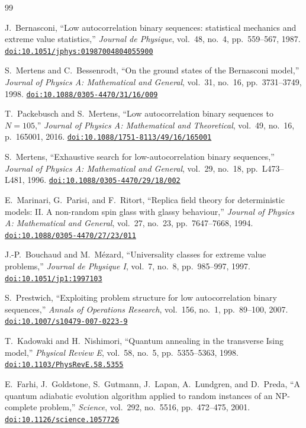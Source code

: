 \documentclass[12pt,a4paper]{report}
\providecommand{\doi}[1]{\href{https://doi.org/#1}{\nolinkurl{doi:#1}}}
\begin{document}
\begin{thebibliography}{99}

J.~Bernasconi,
``Low autocorrelation binary sequences: statistical mechanics and extreme value statistics,''
\emph{Journal de Physique}, vol.~48, no.~4, pp.~559--567, 1987.
\doi{10.1051/jphys:01987004804055900}

S.~Mertens and C.~Bessenrodt,
``On the ground states of the {B}ernasconi model,''
\emph{Journal of Physics A: Mathematical and General}, vol.~31, no.~16, pp.~3731--3749, 1998.
\doi{10.1088/0305-4470/31/16/009}

T.~Packebusch and S.~Mertens,
``Low autocorrelation binary sequences to $N=105$,''
\emph{Journal of Physics A: Mathematical and Theoretical}, vol.~49, no.~16, p.~165001, 2016.
\doi{10.1088/1751-8113/49/16/165001}

S.~Mertens,
``Exhaustive search for low-autocorrelation binary sequences,''
\emph{Journal of Physics A: Mathematical and General}, vol.~29, no.~18, pp.~L473--L481, 1996.
\doi{10.1088/0305-4470/29/18/002}

E.~Marinari, G.~Parisi, and F.~Ritort,
``Replica field theory for deterministic models: II. A non-random spin glass with glassy behaviour,''
\emph{Journal of Physics A: Mathematical and General}, vol.~27, no.~23, pp.~7647--7668, 1994.
\doi{10.1088/0305-4470/27/23/011}

J.-P.~Bouchaud and M.~M{\'e}zard,
``Universality classes for extreme value problems,''
\emph{Journal de Physique I}, vol.~7, no.~8, pp.~985--997, 1997.
\doi{10.1051/jp1:1997103}

S.~Prestwich,
``Exploiting problem structure for low autocorrelation binary sequences,''
\emph{Annals of Operations Research}, vol.~156, no.~1, pp.~89--100, 2007.
\doi{10.1007/s10479-007-0223-9}

T.~Kadowaki and H.~Nishimori,
``Quantum annealing in the transverse Ising model,''
\emph{Physical Review E}, vol.~58, no.~5, pp.~5355--5363, 1998.
\doi{10.1103/PhysRevE.58.5355}

E.~Farhi, J.~Goldstone, S.~Gutmann, J.~Lapan, A.~Lundgren, and D.~Preda,
``A quantum adiabatic evolution algorithm applied to random instances of an NP-complete problem,''
\emph{Science}, vol.~292, no.~5516, pp.~472--475, 2001.
\doi{10.1126/science.1057726}


\end{thebibliography}
\end{document}
